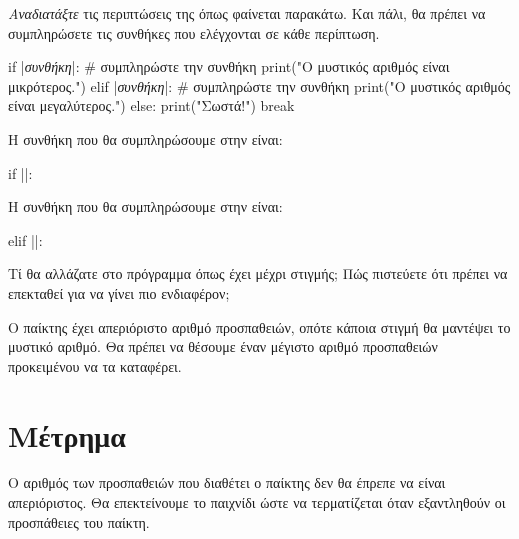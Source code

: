 \documentclass[a4paper,11pt,oneside]{book}
\begin{document}
\begin{step}
\emph{Αναδιατάξτε} τις περιπτώσεις της  όπως φαίνεται παρακάτω. Και πάλι, θα πρέπει να συμπληρώσετε τις συνθήκες που ελέγχονται σε κάθε περίπτωση.

\begin{pynew}
    if |\textrm{\textit{συνθήκη}}|: # συμπληρώστε την συνθήκη
        print("Ο μυστικός αριθμός είναι μικρότερος.")
    elif |\textrm{\textit{συνθήκη}}|: # συμπληρώστε την συνθήκη
        print("Ο μυστικός αριθμός είναι μεγαλύτερος.")
    else:
        print("Σωστά!")
        break
\end{pynew}

\begin{answer}[]
Η συνθήκη που θα συμπληρώσουμε στην  είναι:

\begin{pyplain}
if ||:
\end{pyplain}
		
Η συνθήκη που θα συμπληρώσουμε στην  είναι:	

\begin{pyplain}
elif ||:
\end{pyplain}
\end{answer}
\end{step}

\begin{step}
Τί θα αλλάζατε στο πρόγραμμα όπως έχει μέχρι στιγμής; Πώς πιστεύετε ότι πρέπει να επεκταθεί για να γίνει πιο ενδιαφέρον;

\begin{answer}
Ο παίκτης έχει απεριόριστο αριθμό προσπαθειών, οπότε κάποια στιγμή θα μαντέψει το μυστικό αριθμό. Θα πρέπει να θέσουμε έναν μέγιστο αριθμό προσπαθειών προκειμένου να τα καταφέρει.
\end{answer}
\end{step}

\section{Μέτρημα}

Ο αριθμός των προσπαθειών που διαθέτει ο παίκτης δεν θα έπρεπε να είναι απεριόριστος. Θα επεκτείνουμε το παιχνίδι ώστε να τερματίζεται όταν εξαντληθούν οι προσπάθειες του παίκτη.
\end{document}
